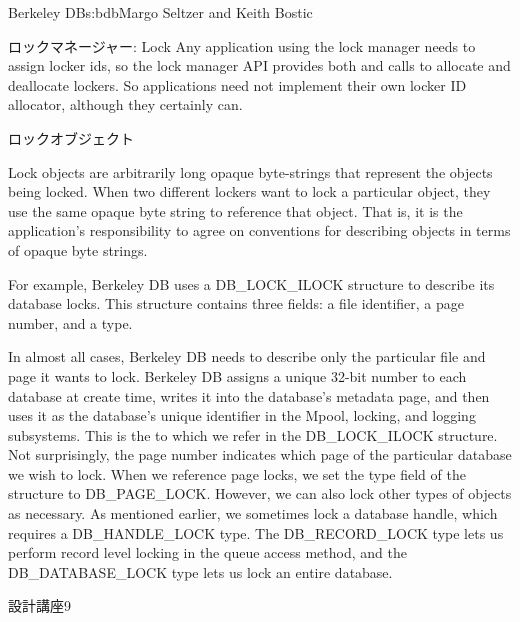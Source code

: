 \begin{aosachapter}{Berkeley DB}{s:bdb}{Margo Seltzer and Keith Bostic}
\begin{aosasect1}{ロックマネージャー: Lock}
Any application using the lock manager needs to assign locker ids, so
the lock manager API provides both 
and  calls to allocate and
deallocate lockers.  So applications need not implement
their own locker ID allocator, although they certainly can.

\begin{aosasect2}{ロックオブジェクト}

Lock objects are arbitrarily long opaque byte-strings that represent
the objects being locked. When two different lockers want to lock a
particular object, they use the same opaque byte string to reference
that object.  That is, it is the application's responsibility to agree
on conventions for describing objects in terms of opaque byte strings.

For example, Berkeley DB uses a DB\_LOCK\_ILOCK structure to describe
its database locks. This structure contains three fields: a file
identifier, a page number, and a type.

In almost all cases, Berkeley DB needs to describe only the particular
file and page it wants to lock. Berkeley DB assigns a unique 32-bit
number to each database at create time, writes it into the database's
metadata page, and then uses it as the database's unique identifier
in the Mpool, locking, and logging subsystems. This is the
 to which we refer in the DB\_LOCK\_ILOCK structure. Not
surprisingly, the page number indicates which page of the particular
database we wish to lock.  When we reference page locks, we set the
type field of the structure to DB\_PAGE\_LOCK\@.  However, we can also
lock other types of objects as necessary. As mentioned earlier, we
sometimes lock a database handle, which requires a DB\_HANDLE\_LOCK
type. The DB\_RECORD\_LOCK type lets us perform record level locking
in the queue access method, and the DB\_DATABASE\_LOCK type lets us
lock an entire database. 
\hspace{-.5cm}
\begin{aosabox}{設計講座9}


\end{aosabox}
\end{aosasect2}
\end{aosasect1}
\end{aosachapter}

